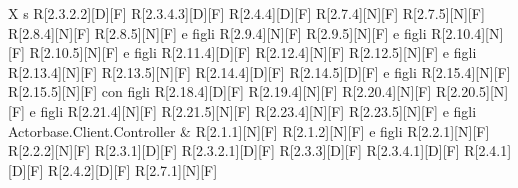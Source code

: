 \begin{longtable}{X s}
		R[2.3.2.2][D][F] \newline R[2.3.4.3][D][F] \newline R[2.4.4][D][F] \newline R[2.7.4][N][F] \newline
		R[2.7.5][N][F] \newline R[2.8.4][N][F] \newline R[2.8.5][N][F] e figli \newline R[2.9.4][N][F] \newline
		R[2.9.5][N][F] e figli \newline R[2.10.4][N][F] \newline R[2.10.5][N][F] e figli \newline 
		R[2.11.4][D][F] \newline R[2.12.4][N][F] \newline R[2.12.5][N][F] e figli \newline R[2.13.4][N][F] \newline
		R[2.13.5][N][F] \newline R[2.14.4][D][F] \newline R[2.14.5][D][F] e figli \newline R[2.15.4][N][F] \newline
		R[2.15.5][N][F] con figli \newline R[2.18.4][D][F] \newline R[2.19.4][N][F] \newline 
		R[2.20.4][N][F] \newline R[2.20.5][N][F] e figli \newline R[2.21.4][N][F] \newline R[2.21.5][N][F] \newline
		R[2.23.4][N][F] \newline R[2.23.5][N][F] e figli
	\\
	\hline
	Actorbase.Client.Controller & R[2.1.1][N][F] \newline R[2.1.2][N][F] e figli \newline R[2.2.1][N][F] \newline 
		R[2.2.2][N][F] \newline R[2.3.1][D][F] \newline R[2.3.2.1][D][F] \newline R[2.3.3][D][F] \newline
		R[2.3.4.1][D][F] \newline R[2.4.1][D][F] \newline R[2.4.2][D][F] \newline R[2.7.1][N][F] \newline

\end{longtable}
